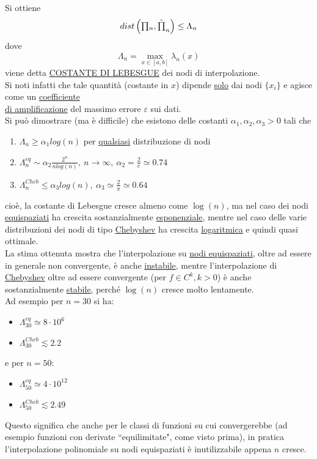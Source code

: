 Si ottiene
\[ dist\left(\begin{matrix}\prod\end{matrix}_n,\tilde{\begin{matrix}\prod\end{matrix}}_n\right)\leq \Lambda_n \]
dove 
\[\Lambda_n= \max_{x\in[a,b]}\lambda_n(x)\]
viene detta \uline{COSTANTE DI LEBESGUE} dei nodi di interpolazione.\\
Si noti infatti che tale quantità (costante in $x$) dipende \uline{solo} dai nodi $\{ x_i \}$ e agisce come un \uline{coefficiente}\\ \uline{di amplificazione} del massimo errore $\varepsilon$ sui dati.\\
Si può dimostrare (ma è difficile) che esistono delle costanti $\alpha_1, \alpha_2, \alpha_3 > 0$ tali che
\begin{enumerate}
    \item $\Lambda_n \geq \alpha_1 log(n)$ per \uline{qualsiasi} distribuzione di nodi
    \item $\Lambda^{eq}_n \sim \alpha_2 \frac{2^n}{nlog(n)}, \ n \to \infty, \ \alpha_2 = \frac{2}{e} \simeq 0.74$
    \item $\Lambda^{Cheb}_n \leq \alpha_3 log(n), \ \alpha_3 \simeq \frac{2}{\pi} \simeq 0.64$
\end{enumerate}
cioè, la costante di Lebesgue cresce almeno come $\log(n)$, ma nel caso dei nodi \uline{equispaziati} ha crescita sostanzialmente \uline{esponenziale}, mentre nel caso delle varie distribuzioni dei nodi di tipo \uline{Chebyshev} ha crescita \uline{logaritmica} e quindi quasi ottimale.\\
La stima ottenuta mostra che l'interpolazione su \uline{nodi equispaziati}, oltre ad essere in generale non convergente, è anche \uline{instabile}, mentre l'interpolazione di \uline{Chebyshev} oltre ad essere convergente (per $f \in C^k, k>0$) è anche sostanzialmente \uline{stabile}, perché $\log(n)$ cresce molto lentamente.\\
Ad esempio per $n=30$ si ha:
\begin{itemize}
\item $\Lambda^{eq}_{30} \simeq 8 \cdot 10^6$
\item $\Lambda^{Cheb}_{30} \lesssim 2.2$
\end{itemize}
e per $n=50$:
\begin{itemize}
\item $\Lambda^{eq}_{50} \simeq 4 \cdot 10^{12}$
\item $\Lambda^{Cheb}_{50} \lesssim 2.49$
\end{itemize}
Questo significa che anche per le classi di funzioni su cui convergerebbe (ad esempio funzioni con derivate ``equilimitate", come visto prima), in pratica l'interpolazione polinomiale su nodi equispaziati è inutilizzabile appena $n$ cresce.\\
